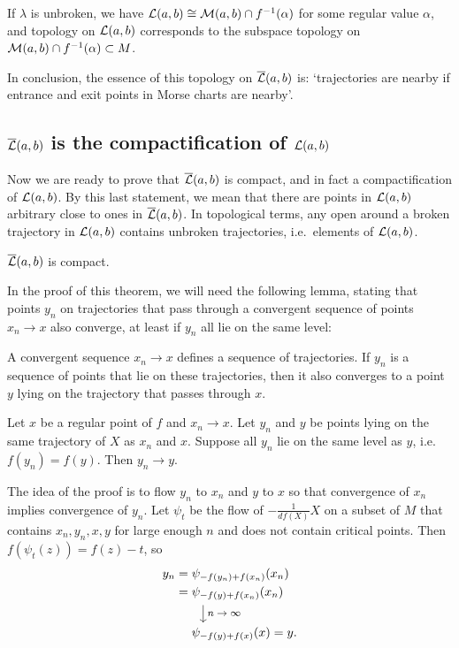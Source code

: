 \begin{remark}
    If $\lambda$ is unbroken, we have $\mathcal L(a, b) \cong \mathcal M(a, b) \cap  f^{-1}(\alpha)$ for some regular value $\alpha$, and topology on $\mathcal L(a, b)$ corresponds to the subspace topology on $\mathcal M(a, b) \cap  f^{-1}(\alpha) \subset M$.
\end{remark}

In conclusion, the essence of this topology on $\overline{\mathcal L}(a, b)$ is: `trajectories are nearby if entrance and exit points in Morse charts are nearby'.

\subsection{$\overline{\mathcal L}(a, b)$ is the compactification of $\mathcal L(a, b)$}
Now we are ready to prove that $\overline{\mathcal L}(a, b)$ is compact, and in fact a compactification of  $\mathcal L(a, b)$. By this last statement, we mean that there are points in $\mathcal L(a, b)$ arbitrary close to ones in  $\overline{\mathcal L}(a, b)$.
In topological terms, any open around a broken trajectory in $\mathcal L(a, b)$ contains unbroken trajectories, i.e.\ elements of $\mathcal L(a, b)$.
\begin{theorem}
    $\overline{\mathcal L}(a, b)$ is compact.
\end{theorem}

In the proof of this theorem, we will need the following lemma, stating that points $y_n$ on trajectories that pass through a convergent sequence of points $x_n \to x$ also converge, at least if $y_n$ all lie on the same level:
\begin{marginfigure}
    \centering
    \caption{A convergent sequence $x_n \to  x$ defines a sequence of trajectories. If $y_n$ is a sequence of points that lie on these trajectories, then it also converges to a point $y$ lying on the trajectory that passes through $x$.}
    \label{fig:lemma-partial-squared-zero-proof}
\end{marginfigure}
\begin{lemma}
    Let $x$ be a regular point of $f$ and $x_n \to x$.
    Let $y_n$ and  $y$ be points lying on the same trajectory of $X$ as  $x_n$ and  $x$.
    Suppose all $y_n$ lie on the same level as  $y$, i.e.\ $f(y_n) = f(y)$.
    Then  $y_n \to  y$.
    \label{lemma:level-sets}
\end{lemma}
\begin{myproof}
    The idea of the proof is to flow $y_n$ to  $x_n$ and $y$ to $x$ so that convergence of $x_n$ implies convergence of $y_n$.
    Let  $\psi_t$ be the flow of  $-\frac{1}{df (X)} X$ on a subset of $M$ that contains $x_n, y_n, x, y$ for large enough  $n$ and does not contain critical points.
    Then $f(\psi_t(z)) = f(z) - t$, so
     \begin{align*}
         y_n &= \psi_{-f(y_n) + f(x_n)}(x_n)\\
         &= \psi_{-f(y) + f(x_n)}(x_n)\\
         & \qquad \tikz \draw[->]  (0,0) -- (0,-0.5) node[midway, right]{\footnotesize$n \to  \infty$};\\[-0.4em]
         &\mbox{}\phantom{{}={}}\psi_{-f(y) + f(x)}(x) = y
    .\end{align*} 
\end{myproof}

